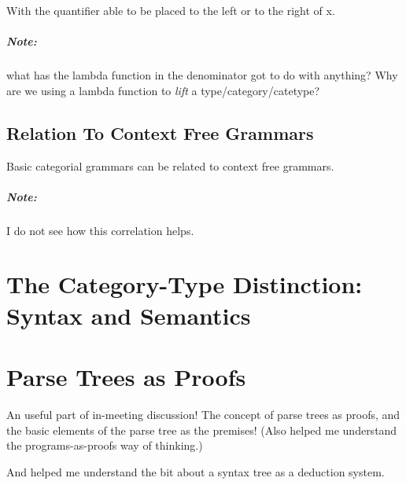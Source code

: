 \documentclass[letterpaper,12pt]{article}
\begin{document}
With the quantifier able to be placed to the left or to the right of x.

\subparagraph{Note:} what has the lambda function in the denominator got to do
with anything? Why are we using a lambda function to \emph{lift} a
type/category/catetype?

\subsection{Relation To Context Free Grammars}

Basic categorial grammars can be related to context free grammars.

\subparagraph{Note:} I do not see how this correlation helps.


\section{The Category-Type Distinction: Syntax and Semantics}


\section{Parse Trees as Proofs}

An useful part of in-meeting discussion! The concept of parse trees as proofs, and the basic elements of the parse tree as the premises! (Also helped me understand the programs-as-proofs way of thinking.)

And helped me understand the bit about a syntax tree as a deduction system.
\end{document}
